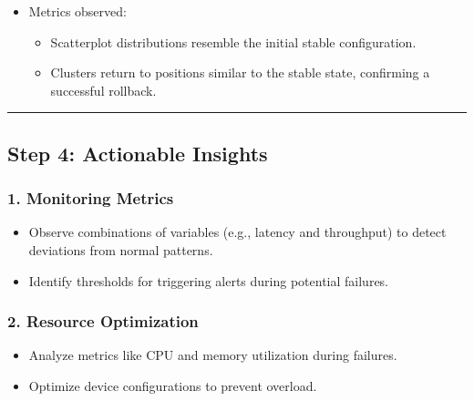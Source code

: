 \documentclass[11pt]{article}
\providecommand{\tightlist}{%
      \setlength{\itemsep}{0pt}\setlength{\parskip}{0pt}}
\begin{document}
\begin{itemize}
\tightlist
\item
  Metrics observed:

  \begin{itemize}
  \tightlist
  \item
    Scatterplot distributions resemble the initial stable configuration.
  \item
    Clusters return to positions similar to the stable state, confirming
    a successful rollback.
  \end{itemize}
\end{itemize}

\begin{center}\rule{0.5\linewidth}{0.5pt}\end{center}

\hypertarget{step-4-actionable-insights}{%
\subsection{\texorpdfstring{\textbf{Step 4: Actionable
Insights}}{Step 4: Actionable Insights}}\label{step-4-actionable-insights}}

\hypertarget{monitoring-metrics}{%
\subsubsection{\texorpdfstring{\textbf{1. Monitoring
Metrics}}{1. Monitoring Metrics}}\label{monitoring-metrics}}

\begin{itemize}
\tightlist
\item
  Observe combinations of variables (e.g., latency and throughput) to
  detect deviations from normal patterns.
\item
  Identify thresholds for triggering alerts during potential failures.
\end{itemize}

\hypertarget{resource-optimization}{%
\subsubsection{\texorpdfstring{\textbf{2. Resource
Optimization}}{2. Resource Optimization}}\label{resource-optimization}}

\begin{itemize}
\tightlist
\item
  Analyze metrics like CPU and memory utilization during failures.
\item
  Optimize device configurations to prevent overload.
\end{itemize}
\end{document}

